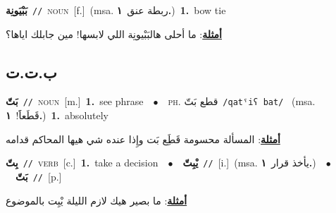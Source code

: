 \documentclass[10pt,a4paper,twoside]{article} %
\begin{document}
\begin{multicols}{2}
{{\setlength\topsep{0pt}\textbf{\foreignlanguage{arabic}{بَبْيَونِة}}\ {\color{gray}\texttt{//}\color{black}}\ \textsc{noun}\ [f.]\ \color{gray}(msa. \foreignlanguage{arabic}{ربطة عنق}~\foreignlanguage{arabic}{\textbf{١.}})\color{black}\ \textbf{1.}~bow tie\  \begin{flushright}\color{gray}\foreignlanguage{arabic}{\textbf{\underline{\foreignlanguage{arabic}{أمثلة}}}: ما أحلى هالبَبْيونِة اللي لابسها! مين جابلك اياها؟}\end{flushright}\color{black}} \vspace{2mm}

\vspace{-3mm}
\subsection*{\color{blue}\foreignlanguage{arabic}{ب.ت.ت}\color{blue}{}} 

{\setlength\topsep{0pt}\textbf{\foreignlanguage{arabic}{بَتّ}}\ {\color{gray}\texttt{//}\color{black}}\ \textsc{noun}\ [m.]\ \textbf{1.}~see phrase\ \ $\bullet$\ \ \textsc{ph.} \color{gray} \foreignlanguage{arabic}{قطع بَتّ}\color{black}\ {\color{gray}\texttt{/{\sffamily qatˤiʕ bat}/}\color{black}}\ \color{gray} (msa. \foreignlanguage{arabic}{قَطَعاََ!}~\foreignlanguage{arabic}{\textbf{١.}})\color{black}\ \textbf{1.}~absolutely\  \begin{flushright}\color{gray}\foreignlanguage{arabic}{\textbf{\underline{\foreignlanguage{arabic}{أمثلة}}}: المسألة محسومة قَطَِع بَت وإِذا عنده شي هيها المحاكم قدامه}\end{flushright}\color{black}} \vspace{2mm}

{\setlength\topsep{0pt}\textbf{\foreignlanguage{arabic}{بِتّ}}\ {\color{gray}\texttt{//}\color{black}}\ \textsc{verb}\ [c.]\ \textbf{1.}~take a decision\ \ $\bullet$\ \ \setlength\topsep{0pt}\textbf{\foreignlanguage{arabic}{يْبِتّ}}\ {\color{gray}\texttt{//}\color{black}}\ [i.]\ \color{gray}(msa. \foreignlanguage{arabic}{يأخذ قرار}~\foreignlanguage{arabic}{\textbf{١.}})\color{black}\ \ $\bullet$\ \ \setlength\topsep{0pt}\textbf{\foreignlanguage{arabic}{بَتّ}}\ {\color{gray}\texttt{//}\color{black}}\ [p.]\  \begin{flushright}\color{gray}\foreignlanguage{arabic}{\textbf{\underline{\foreignlanguage{arabic}{أمثلة}}}: ما بصير هيك لازم الليلة يْبِت بالموضوع}\end{flushright}\color{black}} \vspace{2mm}

}
\end{multicols}
\end{document}
